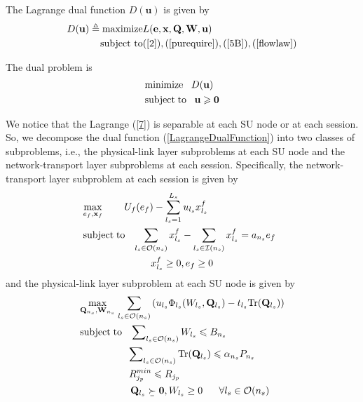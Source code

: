 \documentclass[12pt,onecolumn,tworows]{IEEEtran}
\begin{document}
The Lagrange dual function $D({\mathbf{u}})$ is given by
\begin{eqnarray}\label{LagrangeDualFunction}
   D({\mathbf{u}}) \triangleq \text{maximize}       &L({\mathbf{e,x,Q,W,u}}) \notag\\
    \text{subject to}     &(\ref{2}),(\ref{purequire}),(\ref{5B}),(\ref{flowlaw})
\end{eqnarray}

The dual problem is
\begin{equation}\label{DualProblem}
\begin{gathered}
  {\text{minimize}}\;\;\;D({\mathbf{u}}) \hfill \\
  {\text{subject}}\;{\text{to}}\;\;\;{\mathbf{u}} \geqslant {\mathbf{0}} \hfill \\
\end{gathered}
\end{equation}

We notice that the Lagrange (\ref{7}) is separable at each SU node or at each session.
So, we decompose the dual function (\ref{LagrangeDualFunction}) into two classes of subproblems, i.e., the physical-link layer subproblems at each SU node and the network-transport layer subproblems at each session. Specifically, the network-transport layer subproblem at each session is given by
\begin{equation}\label{10}
\begin{gathered}
  {\max_{{{{e}}_f},{{\mathbf{x}}_f}}}\;\;\;\;\;\;\;\;{ {U_f({e_f}) - \sum\limits_{l_{s} = 1}^{L_s} {{u_{{l_s}}}x_{l_s}^f } } }  \hfill \\
  {\text{subject}}\;{\text{to}} \;\;\;\sum\limits_{{l_s} \in \mathcal{O}({n_s})} {x_{l_s}^f - \sum\limits_{{l_s} \in \mathcal{I}({n_s})} {x_{{l_s}}^f = {a_{n_s}e_f}} }\;\;\\
  x_{l_s}^f\geq 0,e_f\geq 0
\end{gathered}
\end{equation}
and the physical-link layer subproblem at each SU node is given by
\begin{equation}\label{11}
\begin{gathered}
  {\max_{{\mathbf{Q}_{n_s}}{\text{,}}{\mathbf{W}_{n_s}}}}\;{
  \sum\limits_{{l_s} \in \mathcal{O}({n_s})} \left({{u_{{l_s}}}{\Phi _{{l_s}}}({W_{{l_s}}},{{\mathbf{Q}}_{{l_s}}})}  -  {{t_{{l_s}}}\text{Tr}({{\mathbf{Q}}_{{l_s}}})}\right)  \hfill
}  \hfill \\
  {\text{subject}}\;{\text{to}}\;\;\;\sum\nolimits_{{l_s} \in \mathcal{O}({n_s})} {{W_{{l_s}}} \leqslant {B_{{n_s}}}} \;\;\; \hfill  \quad\\
   \;\;\;\;\;\;\;\;\;\;\;\;\;\;\;\;\;\;\sum\nolimits_{{l_s} \in \mathcal{O}({n_s})} {\text{Tr}({{\mathbf{Q}}_{{l_s}}})}  \leqslant \alpha_{n_s} {P_{{n_s}}} \hfill \\
\;\;\;\;\;\;\;\;\;\;\;\;\;\;\;\;\;\;R_{{j_p}}^{min} \leqslant {{ R}_{{j_p}}}\hfill   \quad\\
  \;\;\;\;\;\;\;\;\;\;\;\;\;    {{\mathbf{Q}_{l_s}}}\underset{\raise0.3em\hbox{$\smash{\scriptscriptstyle-}$}}{ \succ } \mathbf{0},{{W}_{l_s}} \geq 0 \;\;\;\;\;\;  \forall {l_s\in \mathcal{O}(n_s)}
\end{gathered}
\end{equation}
\end{document}
